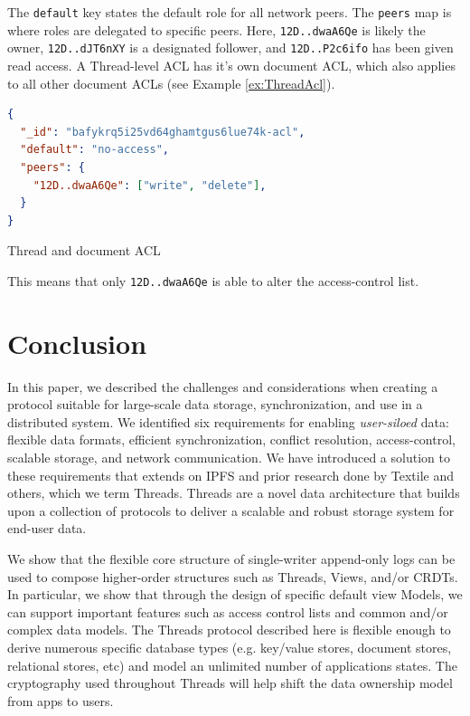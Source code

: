 \documentclass{textile}
\begin{document}
The \texttt{default} key states the default role for all network peers. The \texttt{peers} map is where roles are delegated to specific peers. Here, \texttt{12D..dwaA6Qe} is likely the owner, \texttt{12D..dJT6nXY} is a designated follower, and \texttt{12D..P2c6ifo} has been given read access. A Thread-level ACL has it's own document ACL, which also applies to all other document ACLs (see Example \ref{ex:ThreadAcl}).

\begin{example}
  \begin{lstlisting}[language=json,firstnumber=1]
{
  "_id": "bafykrq5i25vd64ghamtgus6lue74k-acl",
  "default": "no-access",
  "peers": {
    "12D..dwaA6Qe": ["write", "delete"],
  }
}
  \end{lstlisting}
\caption{Thread and document ACL}
\label{ex:ThreadAcl}
\end{example} 

This means that only \texttt{12D..dwaA6Qe} is able to alter the access-control list.

\section{Conclusion}

In this paper, we described the challenges and considerations when creating a protocol suitable for large-scale data storage, synchronization, and use in a distributed system. We identified six requirements for enabling \emph{user-siloed} data: flexible data formats, efficient synchronization, conflict resolution, access-control, scalable storage, and network communication. We have introduced a solution to these requirements that extends on IPFS and prior research done by Textile and others, which we term Threads. Threads are a novel data architecture that builds upon a collection of protocols to deliver a scalable and robust storage system for end-user data. 

We show that the flexible core structure of single-writer append-only logs can be used to compose higher-order structures such as Threads, Views, and/or CRDTs. In particular, we show that through the design of specific default view Models, we can support important features such as access control lists and common and/or complex data models. The Threads protocol described here is flexible enough to derive numerous specific database types (e.g. key/value stores, document stores, relational stores, etc) and model an unlimited number of applications states. The cryptography used throughout Threads will help shift the data ownership model from apps to users. 
\end{document}

